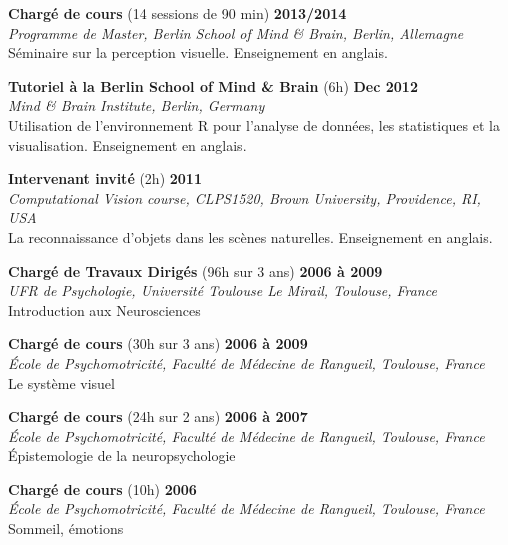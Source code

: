 \documentclass[margin,line]{resume}
\begin{document}
\begin{resume}
	\textbf{Chargé de cours} (14 sessions de 90 min) \hfill \textbf{2013/2014}\\
	\textsl{Programme de Master, Berlin School of Mind \& Brain, Berlin, Allemagne}\\
	Séminaire sur la perception visuelle. Enseignement en anglais.
	
	\vspace{-2mm}
	\textbf{Tutoriel à la Berlin School of Mind \& Brain} (6h) \hfill \textbf{Dec 2012}\\
	\textsl{Mind \& Brain Institute, Berlin, Germany}\\
	Utilisation de l'environnement R pour l'analyse de données, les statistiques et la visualisation.  Enseignement en anglais.

	\vspace{-2mm} 
	\textbf{Intervenant invité} (2h) \hfill \textbf{2011}\\
	\textsl{Computational Vision course, CLPS1520, Brown University, Providence, RI, USA}\\
	La reconnaissance d'objets dans les scènes naturelles. Enseignement en anglais.

	\vspace{-2mm} 
	\textbf{Chargé de Travaux Dirigés} (96h sur 3 ans) \hfill \textbf{2006 à 2009}\\
	\textsl{UFR de Psychologie, Université Toulouse Le Mirail, Toulouse, France}\\
	Introduction aux Neurosciences	

	\vspace{-2mm} 
	\textbf{Chargé de cours} (30h sur 3 ans) \hfill \textbf{2006 à 2009}\\
	\textsl{\'Ecole de Psychomotricité, Faculté de Médecine de Rangueil, Toulouse, France}\\
	Le système visuel 
	
	\vspace{-2mm} 
	\textbf{Chargé de cours} (24h sur 2 ans) \hfill \textbf{2006 à 2007}\\
	\textsl{\'Ecole de Psychomotricité, Faculté de Médecine de Rangueil, Toulouse, France}\\
	\'Epistemologie de la neuropsychologie

	\vspace{-2mm} 
	\textbf{Chargé de cours} (10h) \hfill \textbf{2006}\\
	\textsl{\'Ecole de Psychomotricité, Faculté de Médecine de Rangueil, Toulouse, France}\\
	Sommeil, émotions



\end{resume}
\end{document}
